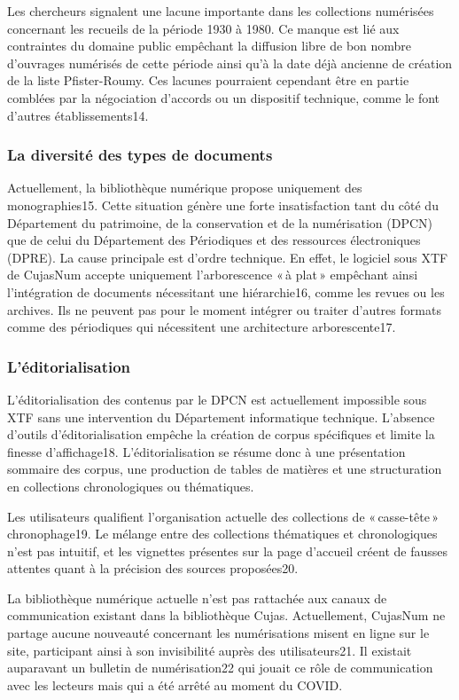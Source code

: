 Les chercheurs signalent une lacune importante dans les collections numérisées concernant les recueils de la période 1930 à 1980. Ce manque est lié aux contraintes du domaine public empêchant la diffusion libre de bon nombre d’ouvrages numérisés de cette période ainsi qu’à la date déjà ancienne de création de la liste Pfister-Roumy. Ces lacunes pourraient cependant être en partie comblées par la négociation d’accords ou un dispositif technique, comme le font d’autres établissements14. 

\subsubsection{La diversité des types de documents} 

	Actuellement, la bibliothèque numérique propose uniquement des monographies15. Cette situation génère une forte insatisfaction tant du côté du Département du patrimoine, de la conservation et de la numérisation (DPCN) que de celui du Département des Périodiques et des ressources électroniques (DPRE). La cause principale est d’ordre technique. En effet, le logiciel sous XTF de CujasNum accepte uniquement l’arborescence « à plat » empêchant ainsi l’intégration de documents nécessitant une hiérarchie16, comme les revues ou les archives. Ils ne peuvent pas pour le moment intégrer ou traiter d’autres formats comme des périodiques qui nécessitent une architecture arborescente17.

\subsubsection{L’éditorialisation} 

L’éditorialisation des contenus par le DPCN est actuellement impossible sous XTF sans une intervention du Département informatique technique. L’absence d’outils d’éditorialisation empêche la création de corpus spécifiques et limite la finesse d’affichage18. L’éditorialisation se résume donc à une présentation sommaire des corpus, une production de tables de matières et une structuration en collections chronologiques ou thématiques. 

Les utilisateurs qualifient l’organisation actuelle des collections de « casse-tête » chronophage19. Le mélange entre des collections thématiques et chronologiques n’est pas intuitif, et les vignettes présentes sur la page d’accueil créent de fausses attentes quant à la précision des sources proposées20.  

La bibliothèque numérique actuelle n’est pas rattachée aux canaux de communication existant dans la bibliothèque Cujas. Actuellement, CujasNum ne partage aucune nouveauté concernant les numérisations misent en ligne sur le site, participant ainsi à son invisibilité auprès des utilisateurs21. Il existait auparavant un bulletin de numérisation22 qui jouait ce rôle de communication avec les lecteurs mais qui a été arrêté au moment du COVID.   

